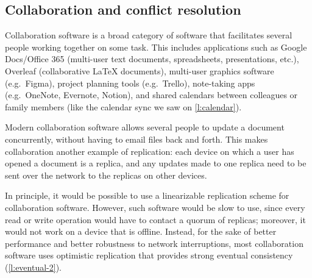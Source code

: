 \subsection{Collaboration and conflict resolution}\label{sec:collaboration}

Collaboration software is a broad category of software that facilitates several people working together on some task.
This includes applications such as Google Docs/Office 365 (multi-user text documents, spreadsheets, presentations, etc.), Overleaf (collaborative {\LaTeX} documents), multi-user graphics software (e.g.\ Figma), project planning tools (e.g.\ Trello), note-taking apps (e.g.\ OneNote, Evernote, Notion), and shared calendars between colleagues or family members (like the calendar sync we saw on \autoref{l:calendar}).

Modern collaboration software allows several people to update a document concurrently, without having to email files back and forth.
This makes collaboration another example of replication: each device on which a user has opened a document is a replica, and any updates made to one replica need to be sent over the network to the replicas on other devices.

In principle, it would be possible to use a linearizable replication scheme for collaboration software.
However, such software would be slow to use, since every read or write operation would have to contact a quorum of replicas; moreover, it would not work on a device that is offline.
Instead, for the sake of better performance and better robustness to network interruptions, most collaboration software uses optimistic replication that provides strong eventual consistency (\autoref{l:eventual-2}).


